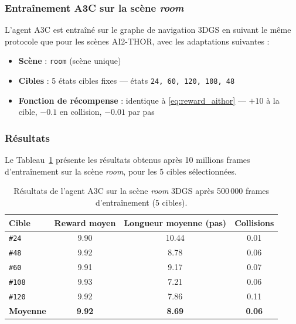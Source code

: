 \subsubsection*{Entraînement A3C sur la scène \textit{room}}

L'agent A3C est entraîné sur le graphe de navigation 3DGS en suivant 
le même protocole que pour les scènes AI2-THOR, avec les adaptations 
suivantes :

\begin{itemize}[noitemsep, topsep=4pt]
    \item \textbf{Scène} : \texttt{room} (scène unique)
    \item \textbf{Cibles} : 5 états cibles fixes — états 
    \texttt{24, 60, 120, 108, 48}
    \item \textbf{Fonction de récompense} : identique à 
    \eqref{eq:reward_aithor} — $+10$ à la cible, $-0.1$ en collision, 
    $-0.01$ par pas
\end{itemize}

\subsubsection*{Résultats}




Le Tableau~\ref{tab:room_results} présente les résultats obtenus après 
10 millions frames d'entraînement sur la scène \textit{room}, pour les 
5 cibles sélectionnées.

\begin{table}[H]
\centering
\footnotesize
\renewcommand{\arraystretch}{1.3}
\begin{tabular}{|l|c|c|c|}
\hline
\rowcolor{gray!20}
\textbf{Cible} & \textbf{Reward moyen} & 
\textbf{Longueur moyenne (pas)} & \textbf{Collisions} \\
\hline
\texttt{\#24}  & 9.90 & 10.44 & 0.01 \\
\texttt{\#48}  & 9.92 & 8.78  & 0.06 \\
\texttt{\#60}  & 9.91 & 9.17  & 0.07 \\
\texttt{\#108} & 9.93 & 7.21  & 0.06 \\
\texttt{\#120} & 9.92 & 7.86  & 0.11 \\
\hline
\rowcolor{blue!15}
\textbf{Moyenne} & \textbf{9.92} & \textbf{8.69} & \textbf{0.06} \\
\hline
\end{tabular}
\caption{Résultats de l'agent A3C sur la scène \textit{room} 3DGS 
après 500\,000 frames d'entraînement (5 cibles).}
\label{tab:room_results}
\end{table}

